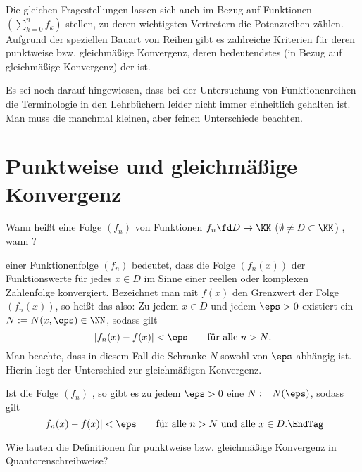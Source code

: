 Die gleichen Fragestellungen lassen sich auch im Bezug auf 
Funktionen $\left(\sum_{k=0}^n f_k \right)$ stellen, zu 
deren wichtigsten Vertretern die Potenzreihen zählen. 
Aufgrund der speziellen Bauart von Reihen 
gibt es zahlreiche Kriterien für deren punktweise bzw. 
gleichmäßige Konvergenz, deren bedeutendstes (in Bezug auf gleichmäßige 
Konvergenz) der  ist. 

Es sei noch darauf hingewiesen, dass bei der 
Untersuchung von Funktionenreihen die Terminologie in den Lehrbüchern 
leider nicht immer einheitlich gehalten ist. Man muss die manchmal 
kleinen, aber feinen Unterschiede beachten.  


\section{Punktweise und gleichmäßige Konvergenz}

\begin{frage}\label{04_glk}
Wann heißt eine Folge $(f_n)$ von Funktionen $f_n \fd D \to \KK$ 
($\emptyset \not= D \subset \KK$) , wann 
?
\end{frage}

\begin{antwort}
 einer Funktionenfolge $(f_n)$
bedeutet, dass die Folge $(f_n(x))$ der Funktionswerte für 
jedes $x\in D$ im Sinne einer reellen oder komplexen Zahlenfolge 
konvergiert. Bezeichnet man mit $f(x)$ den Grenzwert der Folge $(f_n(x))$, 
so heißt das also: Zu jedem $x\in D$ und jedem 
$\eps >0$ existiert ein $N:=N(x,\eps) \in \NN$, sodass gilt
\[
| f_n (x) - f(x) | < \eps  \qquad\text{für alle $n>N$}.
\]
Man beachte, dass in diesem Fall die Schranke $N$ sowohl von $\eps$ 
 abhängig ist. Hierin liegt der Unterschied 
zur gleichmäßigen Konvergenz. 

Ist die Folge $(f_n)$ , so gibt es 
zu jedem $\eps >0$ eine 
$N:=N(\eps)$, sodass gilt 
\[
| f_n (x) - f(x ) | < \eps \qquad\text{für alle $n>N$ und alle $x\in D$}.\EndTag
\] 
\end{antwort}

\begin{frage}
Wie lauten die Definitionen für punktweise bzw. 
gleichmäßige Konvergenz in Quantorenschreibweise? 
\end{frage}

